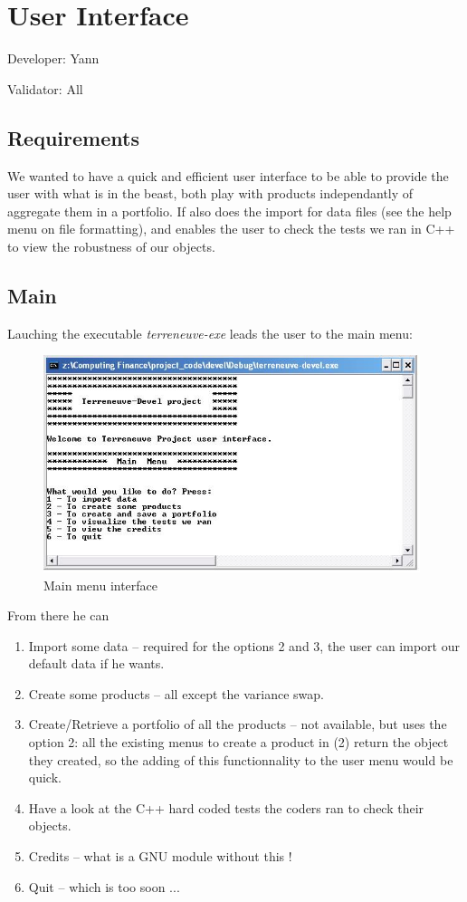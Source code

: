 \chapter{User Interface}
Developer: Yann

\noindent Validator: All



\section{Requirements}

We wanted to have a quick and efficient user interface to be able to provide the user with what is in the beast, both play with products independantly of aggregate them in a portfolio. If also does the import for data files (see the help menu on file formatting), and enables the user to check the tests we ran in C++ to view the robustness of our objects.

\section{Main }

Lauching the executable \textit{terreneuve-exe} leads the user to the main menu:

\begin{figure}[htbp]
\begin{center}
        \includegraphics[width=11cm]{mainmenu.jpg}
        \caption{Main menu interface}
\end{center}
\end{figure}

From there he can 
\begin{enumerate}
	\item Import some data -- required for the options 2 and 3, the user can import our default data if he wants.
	\item Create some products -- all except the variance swap.
	\item Create/Retrieve a portfolio of all the products -- not available, but uses the option 2: all the existing menus to create a product in (2) return the object they created, so the adding of this functionnality to the user menu would be quick.
	\item Have a look at the C++ hard coded tests the coders ran to check their objects.
	\item Credits -- what is a GNU module without this !
	\item Quit -- which is too soon ... 
\end{enumerate}

